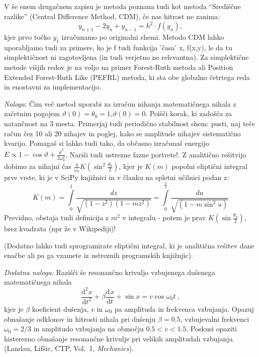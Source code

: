 \documentclass[slovene,11pt,a4paper]{article}
\newcommand{\ddd}{\mathrm{d}}
\newcommand{\Dd}[3][{}]{\frac{\ddd^{#1} #2}{\ddd #3^{#1}}}
\begin{document}
V še enem drugačnem zapisu je metoda poznana tudi kot metoda ``Središčne razlike'' (Central Difference Method, CDM), če nas hitrost ne zanima:
\[
y_{n+1} - 2 y_n + y_{n-1} = h^2 \cdot f(y_n),
\]
kjer prvo točko $y_1$ izračunamo po originalni shemi. Metodo CDM lahko uporabljamo tudi
za primere, ko je f tudi funkcija 'časa' x, f(x,y), le da tu simplektičnost ni zagotovljena
(in tudi verjetno ne relevantna).
Za simplektične metode višjih redov je na voljo na primer Forest-Ruth metoda ali Position
Extended Forest-Ruth Like (PEFRL) metoda, ki sta obe globalno četrtega reda in enostavni za
implementacijo.

\bigskip

{\it Naloga\/}: Čim več metod uporabi za izračun
nihanja matematičnega nihala z začetnim pogojem  $\vartheta(0)= \theta_0 = 1$,$\dot{\vartheta}(0)=0$. 
Poišči korak, ki zadošča za natančnost na 3 mesta. Primerjaj
tudi periodično stabilnost shem: pusti, naj teče račun čez 10
ali 20 nihajev in poglej, kako se amplitude nihajev sistematično
kvarijo. Pomagaš si lahko tudi tako, da občasno izračunaš
energijo $E \propto  1-\cos \vartheta + \frac{\dot{\vartheta}^2 }{2 \omega_0^2} $. Nariši tudi
ustrezne fazne portrete!.
Z analitično rešitvijo dobimo za nihajni čas $\frac{4}{\omega_0} K\left(\sin^2\frac{\theta_0}{2}\right)$, kjer je $K(m)$ popolni
eliptični integral prve vrste, ki je v SciPy knjižnici in v članku na spletni učilnici podan z:
\[
K(m)=\int\limits_{0}^{1} \frac{d z}{\sqrt{\left(1-z^{2}\right)\left(1-m z^{2}\right)}} = \int\limits_{0}^{\frac{\pi}{2}} \frac{d u}{\sqrt{\left(1-m \sin^2{u}\right)}}
\] 
Previdno, obstaja tudi definicija z $m^2$ v integralu - potem je prav $K\left(\sin\frac{\theta_0}{2}\right)$, brez kvadrata (npr že v Wikipediji)!

(Dodatno lahko tudi
sprogramirate eliptični integral, ki je analitična rešitev
dane enačbe ali pa ga vzamete iz ustreznih programskih knjižnjic).

\bigskip

{\it Dodatna naloga\/:} Razišči še resonančno krivuljo
vzbujenega dušenega matematičnega nihala
\begin{equation*}
\Dd[2]{x}{t} + \beta\Dd{x}{t}+ \sin x = v\cos\omega_0t\>,
\end{equation*}
kjer je $\beta$ koeficient dušenja, $v$ in $\omega_0$ pa amplituda in
frekvenca vzbujanja.  Opazuj obnašanje odklonov in hitrosti nihala
pri dušenju $\beta=0.5$, vzbujevalni frekvenci $\omega_0=2/3$ in
amplitudo vzbujanja na območju $0.5 < v < 1.5$.
Poskusi opaziti histerezno obnašanje resonančne krivulje pri velikih amplitudah vzbujanja
(Landau, Lifšic, CTP, Vol.~1, {\sl Mechanics\/}).
\end{document}
